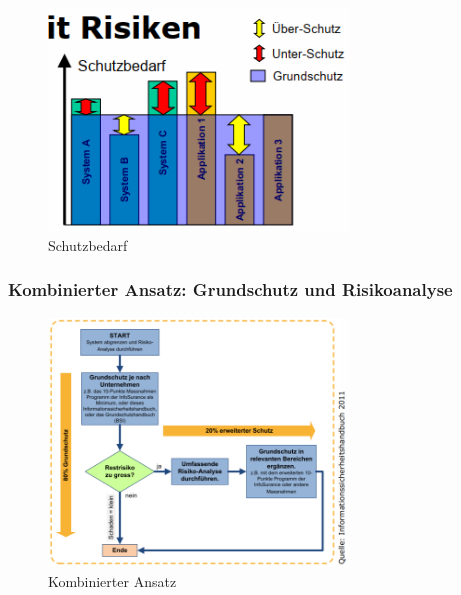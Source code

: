 \documentclass[10pt,a4paper]{article}
\begin{document}
\begin{figure}[H]
    \begin{center}
    \includegraphics[width=8cm]{images/Schutzbedarf.png}
    \caption{Schutzbedarf}
    \label{Schutzbedarf}
    \end{center}
\end{figure}


\subsubsection*{Kombinierter Ansatz: Grundschutz und Risikoanalyse}
\begin{figure}[H]
    \begin{center}
    \includegraphics[width=8cm]{images/Kombinierter_Ansatz.png}
    \caption{Kombinierter Ansatz}
    \label{Kombinierter Ansatz}
    \end{center}
\end{figure}
\end{document}
